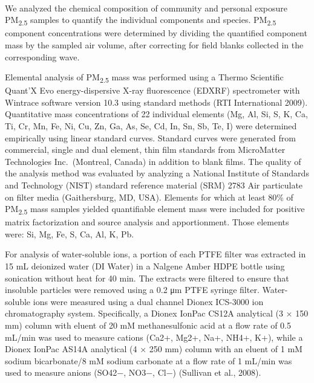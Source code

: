 \documentclass[
  letterpaper,
  DIV=11,
  numbers=noendperiod]{scrartcl}
\let\oldparagraph\paragraph
\renewcommand{\paragraph}[1]{\oldparagraph{#1}\mbox{}}
\providecommand{\DIFaddtex}[1]{{\protect\color{blue}\uwave{#1}}} %
\providecommand{\DIFaddbegin}{} %
\providecommand{\DIFaddend}{} %
\providecommand{\DIFdelbegin}{} %
\providecommand{\DIFdelend}{} %
\providecommand{\DIFadd}[1]{\texorpdfstring{\DIFaddtex{#1}}{#1}} %
\newcommand{\DIFscaledelfig}{0.5}
\newlength{\DIFdelgraphicswidth} %
\newlength{\DIFdelgraphicsheight} %
\newcommand{\DIFaddincludegraphics}[2][]{{\color{blue}\fbox{\DIFOincludegraphics[#1]{#2}}}} %
\newcommand{\DIFdelincludegraphics}[2][]{%
\sbox{\DIFdelgraphicsbox}{\DIFOincludegraphics[#1]{#2}}%
\settoboxwidth{\DIFdelgraphicswidth}{\DIFdelgraphicsbox} %
\settoboxtotalheight{\DIFdelgraphicsheight}{\DIFdelgraphicsbox} %
\scalebox{\DIFscaledelfig}{%
\parbox[b]{\DIFdelgraphicswidth}{\usebox{\DIFdelgraphicsbox}\\[-\baselineskip] \rule{\DIFdelgraphicswidth}{0em}}\llap{\resizebox{\DIFdelgraphicswidth}{\DIFdelgraphicsheight}{%
\setlength{\unitlength}{\DIFdelgraphicswidth}%
\begin{picture}(1,1)%
\thicklines\linethickness{2pt} %
{\color[rgb]{1,0,0}\put(0,0){\framebox(1,1){}}}%
{\color[rgb]{1,0,0}\put(0,0){\line( 1,1){1}}}%
{\color[rgb]{1,0,0}\put(0,1){\line(1,-1){1}}}%
\end{picture}%
}\hspace*{3pt}}} %
} %
\DeclareRobustCommand{\DIFaddbegin}{\DIFOaddbegin \let\includegraphics\DIFaddincludegraphics} %
\DeclareRobustCommand{\DIFaddend}{\DIFOaddend \let\includegraphics\DIFOincludegraphics} %
\DeclareRobustCommand{\DIFdelbegin}{\DIFOdelbegin \let\includegraphics\DIFdelincludegraphics} %
\DeclareRobustCommand{\DIFdelend}{\DIFOaddend \let\includegraphics\DIFOincludegraphics} %
\begin{document}
\DIFdelbegin %
\DIFdelend \DIFaddbegin \paragraph{\DIFadd{Chemical analysis of PM
mass}}\label{chemical-analysis-of-pm-mass}
\DIFaddend 

We analyzed the chemical composition of community and personal exposure
PM\textsubscript{2.5} samples to quantify the individual components and
species. PM\textsubscript{2.5} component concentrations were determined
by dividing the quantified component mass by the sampled air volume,
after correcting for field blanks collected in the corresponding wave.

Elemental analysis of PM\textsubscript{2.5} mass was performed using a
Thermo Scientific Quant'X Evo energy-dispersive X-ray fluorescence
(EDXRF) spectrometer with Wintrace software version 10.3 using standard
methods (RTI International 2009). Quantitative mass concentrations of 22
individual elements (Mg, Al, Si, S, K, Ca, Ti, Cr, Mn, Fe, Ni, Cu, Zn,
Ga, As, Se, Cd, In, Sn, Sb, Te, I) were determined empirically using
linear standard curves. Standard curves were generated from commercial,
single and dual element, thin film standards from MicroMatter
Technologies Inc.~(Montreal, Canada) in addition to blank films. The
quality of the analysis method was evaluated by analyzing a National
Institute of Standards and Technology (NIST) standard reference material
(SRM) 2783 Air particulate on filter media (Gaithersburg, MD, USA).
Elements for which at least 80\% of PM\textsubscript{2.5} mass samples
yielded quantifiable element mass were included for positive matrix
factorization and source analysis and apportionment. Those elements
were: Si, Mg, Fe, S, Ca, Al, K, Pb.

For analysis of water-soluble ions, a portion of each PTFE filter was
extracted in 15 mL deionized water (DI Water) in a Nalgene Amber HDPE
bottle using sonication without heat for 40 min. The extracts were
filtered to ensure that insoluble particles were removed using a 0.2 μm
PTFE syringe filter. Water-soluble ions were measured using a dual
channel Dionex ICS-3000 ion chromatography system. Specifically, a
Dionex IonPac CS12A analytical (3 × 150 mm) column with eluent of 20 mM
methanesulfonic acid at a flow rate of 0.5 mL/min was used to measure
cations (Ca2+, Mg2+, Na+, NH4+, K+), while a Dionex IonPac AS14A
analytical (4 × 250 mm) column with an eluent of 1 mM sodium
bicarbonate/8 mM sodium carbonate at a flow rate of 1 mL/min was used to
measure anions (SO42−, NO3−, Cl−) (Sullivan et al., 2008).
\end{document}

